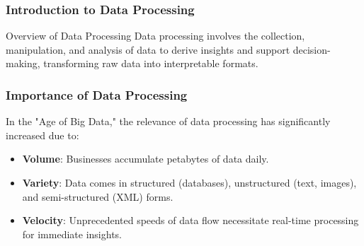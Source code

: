 \documentclass[aspectratio=169]{beamer}
\begin{document}
\frame{\titlepage}

\begin{frame}[fragile]
  \frametitle{Introduction to Data Processing}
  \begin{block}{Overview of Data Processing}
    Data processing involves the collection, manipulation, and analysis of data to derive insights and support decision-making, transforming raw data into interpretable formats.
  \end{block}
\end{frame}

\begin{frame}[fragile]
  \frametitle{Importance of Data Processing}
  In the "Age of Big Data," the relevance of data processing has significantly increased due to:
  \begin{itemize}
    \item \textbf{Volume}: Businesses accumulate petabytes of data daily.
    \item \textbf{Variety}: Data comes in structured (databases), unstructured (text, images), and semi-structured (XML) forms.
    \item \textbf{Velocity}: Unprecedented speeds of data flow necessitate real-time processing for immediate insights.
  \end{itemize}
\end{frame}
\end{document}
